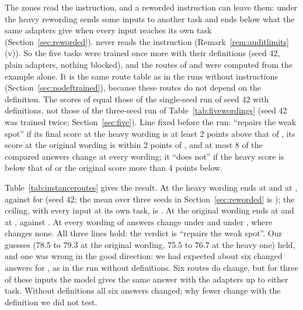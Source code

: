 The zones read the instruction, and a reworded instruction can leave them: under the heavy
rewording \cert{} sends some inputs to another task and ends below what the same adapters give
when every input reaches its own task (Section~\ref{sec:reworded}). \recog{} never
reads the instruction (Remark~\ref{rem:auditlimits}(v)). So the five tasks were trained once more
with their definitions (seed 42, plain adapters, nothing blocked), and the routes of \recog{} and
\handicap{} were computed from the example alone. It is the same route table as in the runs without
instructions (Section~\ref{sec:nodeftrained}), because these routes do not depend on the definition.
The scores of \cert{} equal those of the single-seed run of seed 42 with definitions, not those of the three-seed run of Table~\ref{tab:fivewordings} (seed 42 was trained twice; Section~\ref{sec:five}).
Line fixed before the run: \recog{} ``repairs the weak spot'' if its final score at the heavy
wording is at least 2 points above that of \cert{}, its score at the original wording is within
2 points of \cert{}, and at most 8 of the \AudUCompared{} compared answers change at every wording;
it ``does not'' if the heavy score is below that of \cert{} or the original score more than 4
points below.

\begin{table}[t]
  \caption{The five tasks with their definitions, seed 42, T5-base, 10 epochs, plain adapters; the
  same adapters under each rule, at the four wordings of the definition. Top: final score (AP,
  re-test). Bottom: answers to the test inputs of the first four tasks that differ at the end from
  the answer right after their task was learned, of \AudUCompared{}. \recog{} and \handicap{} set
  the route from the example alone; ``zone first'' uses the certified route where the input is
  inside a zone and the route of \recog{} or \handicap{} elsewhere. The rows of the published
  methods are from the run of the same seed in Section~\ref{sec:reworded}.}
  \label{tab:instanceroutes}
  \centering
  
\end{table}

Table~\ref{tab:instanceroutes} gives the result. At the heavy wording \recog{} ends at
\AudUHeavyRidgeAP{} and \handicap{} at \AudUHeavyHandicapAP{}, against \AudUHeavyCertAP{} for
\cert{} (seed 42; the mean over three seeds in Section~\ref{sec:reworded} is \FiveCertAPHeavy{});
the ceiling, with every input at its own task, is \AudUHeavyOwnAP{}. At the original
wording \recog{} ends at \AudUOriginalRidgeAP{} and \handicap{} at \AudUOriginalHandicapAP{},
against \AudUOriginalCertAP{}. At every wording \AudUOriginalRidgeChanged{} of \AudUCompared{}
answers change under \recog{} and \AudUOriginalHandicapChanged{} under \handicap{}, where \cert{}
changes none. All three lines hold: the verdict is ``repairs the weak spot''.
Our guesses (78.5 to 79.3 at the original wording, 75.5 to 76.7 at the heavy one) held, and one
was wrong in the good direction: we had expected about six changed answers for \recog{}, as in
the run without definitions. Six routes do change, but for three
of these inputs the model gives the same answer with the adapters up to either task. Without
definitions all six answers changed; why fewer change with the definition we did not test.

